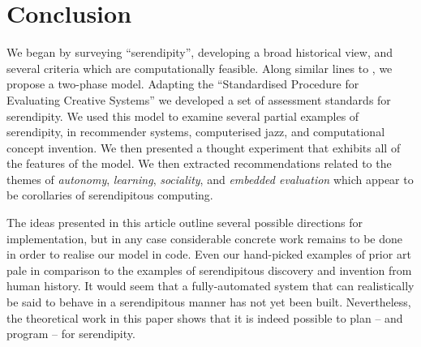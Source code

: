 \section{Conclusion} \label{sec:conclusion}

%
We began by surveying ``serendipity'', developing a broad historical
view, and several criteria which are computationally feasible.  Along
similar lines to , we propose a two-phase
model.
%
%
Adapting the ``Standardised Procedure for Evaluating Creative
Systems'' we developed a set of assessment standards for serendipity.
%
%
We used this model to examine several partial examples of serendipity,
in recommender systems, computerised jazz, and computational concept
invention.  We then presented a thought experiment that exhibits all
of the features of the model.
%
We then extracted recommendations related to the themes of
\emph{autonomy}, \emph{learning}, \emph{sociality}, and \emph{embedded
  evaluation} which appear to be corollaries of serendipitous
computing.  


The ideas presented in this article outline several possible
directions for implementation, but in any case considerable concrete
work remains to be done in order to realise our model in code.  Even
our hand-picked examples of prior art pale in comparison to the
examples of serendipitous discovery and invention from human history.
It would seem that a fully-automated system that can realistically be
said to behave in a serendipitous manner has not yet been built.
Nevertheless, the theoretical work in this paper shows that it is
indeed possible to plan -- and program -- for serendipity.
